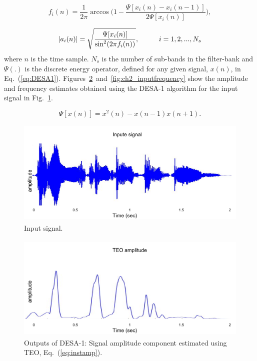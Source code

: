 {\begin{equation}
	\label{eq:instfreq}
	f_i(n) = \frac{1}{2\pi}\arccos \Big (1-\frac{\Psi[x_i(n)-x_i(n-1)]}{2\Psi[x_i(n)]}\Big),
\end{equation}
	
	
\begin{equation}
	\label{eq:instamp}
	|a_i(n)| = \sqrt{\frac{\Psi[x_i(n)]}{\sin^2(2\pi f_i(n))}} , \hspace{10mm}i=1,2,...,N_s
\end{equation}
where $n$ is the time sample. $N_s$ is the number of sub-bands in the filter-bank and $\Psi(.)$ is the discrete energy operator, defined for any given signal, $x(n)$, in Eq.~(\ref{eq:DESA1}). Figures~\ref{fig:ch2_inputamplitude}~and~\ref{fig:ch2_inputfrequency} show the amplitude and frequency estimates obtained using the DESA-1 algorithm for the input signal in Fig.~\ref{fig:ch2_inputsignal}. 

\begin{equation}
	\label{eq:DESA1}
	\Psi [x(n)] = x^2(n)-x(n-1)x(n+1).
\end{equation}


\begin{figure}[h!]
	\centering
	\includegraphics[height=2in, width=1\textwidth]{figures/teo_signal}
	\caption{ Input signal.}
	\label{fig:ch2_inputsignal}
\end{figure}
	
\vspace{1.0mm}
\begin{figure}[h!]
	\centering
	\includegraphics[height=2in, width=1\textwidth]{figures/teo_amp}
	\caption{ Outputs of DESA-1: Signal amplitude component estimated using TEO, Eq.~(\ref{eq:instamp}).}
	\label{fig:ch2_inputamplitude}
\end{figure}

}
